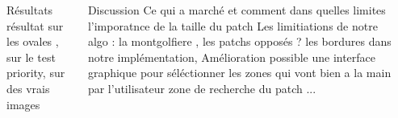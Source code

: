 \documentclass[final,hyperref={pdfpagelabels=false}]{beamer}
\begin{document}
\begin{frame}[t]
\begin{columns}[t]
\begin{column}{.465\textwidth}
\begin{block}{Résultats}
résultat sur les ovales , sur le test priority, sur des vrais images 


\end{block}
\end{column}

\begin{block}{Discussion}
Ce qui a marché et comment dans quelles limites 
l'imporatnce de la taille du patch 
Les limitiations de notre algo : la montgolfiere , les patchs opposés ? 
les bordures dans notre implémentation,
Amélioration possible
une interface graphique pour séléctionner les zones qui vont bien a la main par l'utilisateur 
zone de recherche du patch ... 
\end{block}
\begin{column}{.465\textwidth}
\end{column}


\end{columns}
\end{frame}
\end{document}
